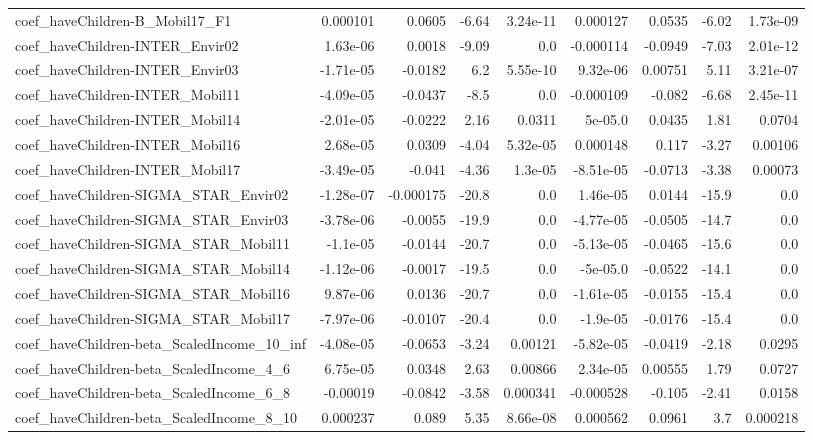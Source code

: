 \begin{tabular}{lrrrrrrrr}
coef_haveChildren-B_Mobil17_F1 & 0.000101 & 0.0605 & -6.64 & 3.24e-11 & 0.000127 & 0.0535 & -6.02 & 1.73e-09 \\
coef_haveChildren-INTER_Envir02 & 1.63e-06 & 0.0018 & -9.09 & 0.0 & -0.000114 & -0.0949 & -7.03 & 2.01e-12 \\
coef_haveChildren-INTER_Envir03 & -1.71e-05 & -0.0182 & 6.2 & 5.55e-10 & 9.32e-06 & 0.00751 & 5.11 & 3.21e-07 \\
coef_haveChildren-INTER_Mobil11 & -4.09e-05 & -0.0437 & -8.5 & 0.0 & -0.000109 & -0.082 & -6.68 & 2.45e-11 \\
coef_haveChildren-INTER_Mobil14 & -2.01e-05 & -0.0222 & 2.16 & 0.0311 & 5e-05.0 & 0.0435 & 1.81 & 0.0704 \\
coef_haveChildren-INTER_Mobil16 & 2.68e-05 & 0.0309 & -4.04 & 5.32e-05 & 0.000148 & 0.117 & -3.27 & 0.00106 \\
coef_haveChildren-INTER_Mobil17 & -3.49e-05 & -0.041 & -4.36 & 1.3e-05 & -8.51e-05 & -0.0713 & -3.38 & 0.00073 \\
coef_haveChildren-SIGMA_STAR_Envir02 & -1.28e-07 & -0.000175 & -20.8 & 0.0 & 1.46e-05 & 0.0144 & -15.9 & 0.0 \\
coef_haveChildren-SIGMA_STAR_Envir03 & -3.78e-06 & -0.0055 & -19.9 & 0.0 & -4.77e-05 & -0.0505 & -14.7 & 0.0 \\
coef_haveChildren-SIGMA_STAR_Mobil11 & -1.1e-05 & -0.0144 & -20.7 & 0.0 & -5.13e-05 & -0.0465 & -15.6 & 0.0 \\
coef_haveChildren-SIGMA_STAR_Mobil14 & -1.12e-06 & -0.0017 & -19.5 & 0.0 & -5e-05.0 & -0.0522 & -14.1 & 0.0 \\
coef_haveChildren-SIGMA_STAR_Mobil16 & 9.87e-06 & 0.0136 & -20.7 & 0.0 & -1.61e-05 & -0.0155 & -15.4 & 0.0 \\
coef_haveChildren-SIGMA_STAR_Mobil17 & -7.97e-06 & -0.0107 & -20.4 & 0.0 & -1.9e-05 & -0.0176 & -15.4 & 0.0 \\
coef_haveChildren-beta_ScaledIncome_10_inf & -4.08e-05 & -0.0653 & -3.24 & 0.00121 & -5.82e-05 & -0.0419 & -2.18 & 0.0295 \\
coef_haveChildren-beta_ScaledIncome_4_6 & 6.75e-05 & 0.0348 & 2.63 & 0.00866 & 2.34e-05 & 0.00555 & 1.79 & 0.0727 \\
coef_haveChildren-beta_ScaledIncome_6_8 & -0.00019 & -0.0842 & -3.58 & 0.000341 & -0.000528 & -0.105 & -2.41 & 0.0158 \\
coef_haveChildren-beta_ScaledIncome_8_10 & 0.000237 & 0.089 & 5.35 & 8.66e-08 & 0.000562 & 0.0961 & 3.7 & 0.000218 \\

\end{tabular}
